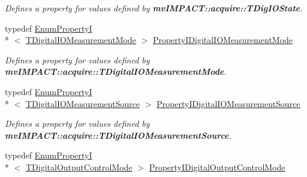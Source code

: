 \begin{DoxyCompactItemize}
\begin{DoxyCompactList}\small\item\em Defines a property for values defined by {\bfseries mv\+I\+M\+P\+A\+C\+T\+::acquire\+::\+T\+Dig\+I\+O\+State}. \end{DoxyCompactList}\item 
\hypertarget{group___device_specific_interface_ga6cece59259630b01f8e2854bcaa86337}{typedef \hyperlink{classmv_i_m_p_a_c_t_1_1acquire_1_1_enum_property_i}{Enum\+Property\+I}\\*
$<$ \hyperlink{group___device_specific_interface_ga85a0b4826a79540c0542e50616f287ad}{T\+Digital\+I\+O\+Measurement\+Mode} $>$ \hyperlink{group___device_specific_interface_ga6cece59259630b01f8e2854bcaa86337}{Property\+I\+Digital\+I\+O\+Measurement\+Mode}}\label{group___device_specific_interface_ga6cece59259630b01f8e2854bcaa86337}

\begin{DoxyCompactList}\small\item\em Defines a property for values defined by {\bfseries mv\+I\+M\+P\+A\+C\+T\+::acquire\+::\+T\+Digital\+I\+O\+Measurement\+Mode}. \end{DoxyCompactList}\item 
\hypertarget{group___device_specific_interface_gab3270cf1acd74b272fe15c80f8fadfc4}{typedef \hyperlink{classmv_i_m_p_a_c_t_1_1acquire_1_1_enum_property_i}{Enum\+Property\+I}\\*
$<$ \hyperlink{group___device_specific_interface_gadcaf6d1f6549e591bf57e04cd7892b6a}{T\+Digital\+I\+O\+Measurement\+Source} $>$ \hyperlink{group___device_specific_interface_gab3270cf1acd74b272fe15c80f8fadfc4}{Property\+I\+Digital\+I\+O\+Measurement\+Source}}\label{group___device_specific_interface_gab3270cf1acd74b272fe15c80f8fadfc4}

\begin{DoxyCompactList}\small\item\em Defines a property for values defined by {\bfseries mv\+I\+M\+P\+A\+C\+T\+::acquire\+::\+T\+Digital\+I\+O\+Measurement\+Source}. \end{DoxyCompactList}\item 
\hypertarget{group___device_specific_interface_ga00cd9778dbab384a83457d98ff8c3d97}{typedef \hyperlink{classmv_i_m_p_a_c_t_1_1acquire_1_1_enum_property_i}{Enum\+Property\+I}\\*
$<$ \hyperlink{group___device_specific_interface_ga8f01f0c294f3f5476c9b9ffcec55a80b}{T\+Digital\+Output\+Control\+Mode} $>$ \hyperlink{group___device_specific_interface_ga00cd9778dbab384a83457d98ff8c3d97}{Property\+I\+Digital\+Output\+Control\+Mode}}\label{group___device_specific_interface_ga00cd9778dbab384a83457d98ff8c3d97}


\end{DoxyCompactItemize}
